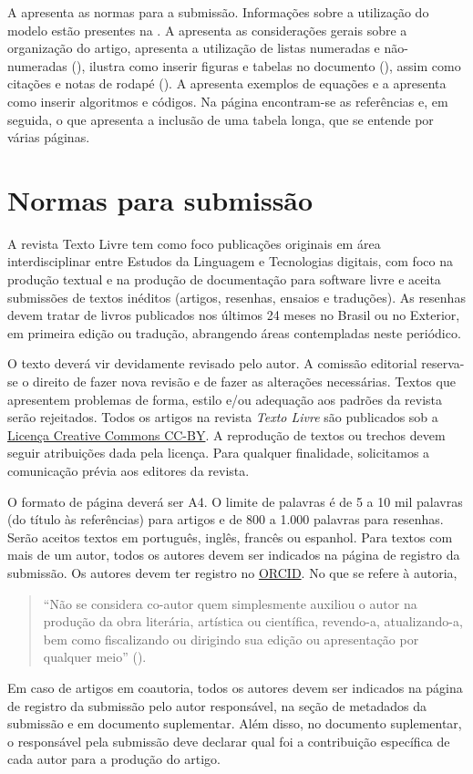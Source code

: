 \documentclass{textolivre}
\begin{document}
A  apresenta as normas para a submissão. Informações sobre a utilização do modelo
estão presentes na . A  apresenta as considerações gerais sobre a organização do artigo, 
apresenta a utilização de listas numeradas e não-numeradas (), 
ilustra como inserir figuras e tabelas no documento (), assim como citações 
e notas de rodapé (). A  apresenta exemplos de equações 
e a  apresenta como inserir algoritmos e códigos. 
Na página \pageref{sec-bib} encontram-se as referências e, em seguida, o  que
apresenta a inclusão de uma tabela longa, que se entende por várias páginas. 

\lipsum[1-5]

\section{Normas para submissão}\label{sec-normas}
A revista Texto Livre tem como foco publicações originais em área interdisciplinar entre 
Estudos da Linguagem e Tecnologias digitais, com foco na produção textual e na produção de 
documentação para software livre e aceita submissões de textos inéditos (artigos, resenhas, ensaios e traduções). 
As resenhas devem tratar de livros publicados nos últimos 24 meses no Brasil ou no Exterior, 
em primeira edição ou tradução, abrangendo áreas contempladas neste periódico.

O texto deverá vir devidamente revisado pelo autor. A comissão editorial reserva-se o direito de 
fazer nova revisão e de fazer as alterações necessárias. Textos que apresentem problemas de forma, 
estilo e/ou adequação aos padrões da revista serão rejeitados.
Todos os artigos na revista \textit{Texto Livre} são publicados sob 
a \href{https://creativecommons.org/}{Licença Creative Commons CC-BY}. 
A reprodução de textos ou trechos devem seguir atribuições dada pela licença. 
Para qualquer finalidade, solicitamos a comunicação prévia aos editores da revista.

O formato de página deverá ser A4. O limite de palavras é de 5 a 10 mil palavras (do título às referências) 
para artigos e de 800 a 1.000 palavras para resenhas.
Serão aceitos textos em português, inglês, francês ou espanhol. 
Para textos com mais de um autor, todos os autores devem ser indicados na página de registro da submissão.
Os autores devem ter registro no \href{https://orcid.org/}{ORCID}. No que se refere à autoria,
\begin{quote} 
``Não se considera co-autor quem simplesmente auxiliou o autor na produção da obra literária, artística ou científica, 
revendo-a, atualizando-a, bem como fiscalizando ou dirigindo sua edição ou apresentação por qualquer meio'' ().
\end{quote}
Em caso de artigos em coautoria, todos os autores devem ser indicados na página de registro da submissão pelo autor 
responsável, na seção de metadados da submissão e em documento suplementar. Além disso, no documento suplementar, 
o responsável pela submissão deve declarar qual foi a contribuição específica de cada autor para a produção do artigo.
\end{document}
